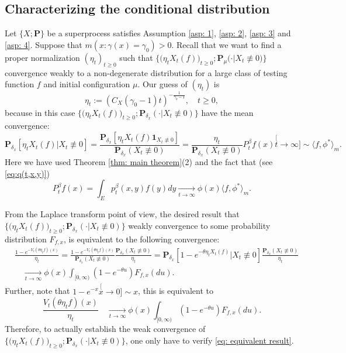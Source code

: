 \documentclass[12pt, a4paper]{amsart}
\theoremstyle{definition}
\numberwithin{equation}{section}
\begin{document}
\subsection{Characterizing the conditional distribution}
\label{sec: conditional distribution}
	Let $\{X; \mathbf P\}$ be a superprocess satisfies Assumption \ref{asp: 1}, \ref{asp: 2}, \ref{asp: 3} and \ref{asp: 4}.
	Suppose that $m(x: \gamma(x) = \gamma_0)>0$. 
	Recall that we want to find a proper normalization $(\eta_t)_{t\geq 0}$ such that $\big\{\big(\eta_t X_t(f))_{t \geq 0}; \mathbf P_\mu(\cdot | X_t \not \equiv 0\big)\big\}$ convergence weakly to a non-degenerate distribution for a large class of testing function $f$ and initial configuration $\mu$.
	Our guess of $(\eta_t)$ is 
\[
	\eta_t
	:= (C_X(\gamma_0 - 1) t)^{-\frac{1}{\gamma_0 - 1}},
	\quad t\geq 0,
\] 
	because in this case $\big\{\big(\eta_t X_t(f)\big)_{t \geq 0}; \mathbf P_{\delta_x}(\cdot | X_t \not \equiv 0)\big\}$ have the mean convergence:
 \[
 	\mathbf P_{\delta_x}[\eta_t X_t(f)|X_t \not \equiv 0]
	= \frac{\mathbf P_{\delta_x}[\eta_t X_t(f) \mathbf 1_{X_t \not \equiv 0}]} {\mathbf P_{\delta_x}(X_t \not \equiv 0) }
	= \frac{\eta_t}{\mathbf P_{\delta_x}(X_t \not \equiv 0)} P^\beta_t f(x)
	\stackrel[t\to \infty]{}{\sim}  \langle f,\phi^* \rangle_m.
 \]
 	Here we have used Theorem \ref{thm: main theorem}(2) and the fact that (see \eqref{eq:q(t,x,y)})
 \[
 	P^\beta_t f(x)
 	= \int_E p_t^\beta(x,y)f(y)dy 
 	\xrightarrow[t\to \infty]{}  \phi(x) \langle f,\phi^*\rangle_m.
 \]
 	
 	From the Laplace transform point of view, the desired result that $\big\{\big(\eta_t X_t(f)\big)_{t \geq 0}; \mathbf P_{\delta_x}(\cdot | X_t \not \equiv 0)\big\}$ weakly convergence to some probability distribution $F_{f,x}$, is equivalent to the following convergence:
\[\begin{split}
 	&\frac{1-e^{- V_t(\theta \eta_t f)(x)}}{\eta_t} 
	= \frac{1-e^{- V_t(\theta \eta_t f)(x)}}{\mathbf P_{\delta_x}(X_t \not \equiv 0)} \frac{ \mathbf P_{\delta_x}(X_t \not \equiv 0) } { \eta_t }
	= \mathbf P_{\delta_x}[1-e^{-\theta \eta_t X_t(f)}| X_t \not \equiv 0]  \frac{ \mathbf P_{\delta_x}(X_t \not \equiv 0) } { \eta_t }
	\\&\quad \xrightarrow[t\to \infty]{} \phi(x) \int_{[0,\infty)}(1-e^{-\theta u})F_{f,x}(du).
\end{split}\] 
	Further, note that $1-e^{-x} \stackrel[x\to 0]{}{\sim} x$, this is equivalent to
\[\label{eq: equivalent result}
	\frac{V_t(\theta \eta_t f)(x)}{\eta_t}  
	\quad \xrightarrow[t\to \infty]{} \phi(x) \int_{[0,\infty)}(1-e^{-\theta u})F_{f,x}(du).
\]
	Therefore, to actually establish the weak convergence of $\big\{\big(\eta_t X_t(f)\big)_{t \geq 0}; \mathbf P_{\delta_x}(\cdot | X_t \not \equiv 0)\big\}$, one only have to verify \eqref{eq: equivalent result}.
	
\end{document}
